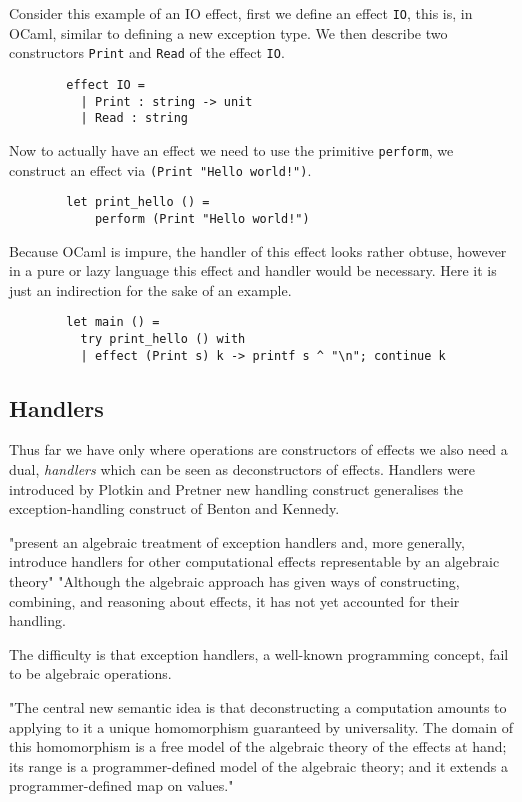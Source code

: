 \begin{example}
    Consider this example of an IO effect,
    first we define an effect \texttt{IO},
    this is, in OCaml, similar to defining
    a new exception type.
    We then describe two constructors
    \texttt{Print} and \texttt{Read}
    of the effect \texttt{IO}.
    \begin{verbatim}
        effect IO =
          | Print : string -> unit
          | Read : string\end{verbatim}
    Now to actually have an effect we need to use the primitive \texttt{perform},
    we construct an effect via \texttt{(Print "Hello world!")}.
    \begin{verbatim}
        let print_hello () =
            perform (Print "Hello world!")\end{verbatim}
    Because OCaml is impure, the handler of this effect looks rather obtuse,
    however in a pure or lazy language this effect and handler would be necessary.
    Here it is just an indirection for the sake of an example.
    \begin{verbatim}
        let main () =
          try print_hello () with
          | effect (Print s) k -> printf s ^ "\n"; continue k\end{verbatim}
\end{example}

\subsection{Handlers}
Thus far we have only
where operations are constructors of effects
we also need a dual,
\textit{handlers} which can be seen as deconstructors of effects\cite{Plotkin:2002dw}.
Handlers were introduced by Plotkin and Pretner\cite{Plotkin:2009dr}
new handling construct generalises the exception-handling construct of Benton and Kennedy. \cite{benton2001exceptional}

"present an algebraic treatment of exception handlers and,
more generally, introduce handlers for other computational effects
representable by an algebraic theory"
"Although the algebraic approach has given ways of constructing,
combining, and reasoning about effects, it has not yet accounted for their handling.


The difficulty is that exception handlers, a well-known programming concept,
fail to be algebraic operations.

"The central new semantic idea is that deconstructing a computation amounts to
applying to it a unique homomorphism guaranteed by universality.
The domain of this homomorphism is a free model of the algebraic theory of the effects at hand;
its range is a programmer-defined model of the algebraic theory;
and it extends a programmer-defined map on values."
\cite{Plotkin:2009dr}


